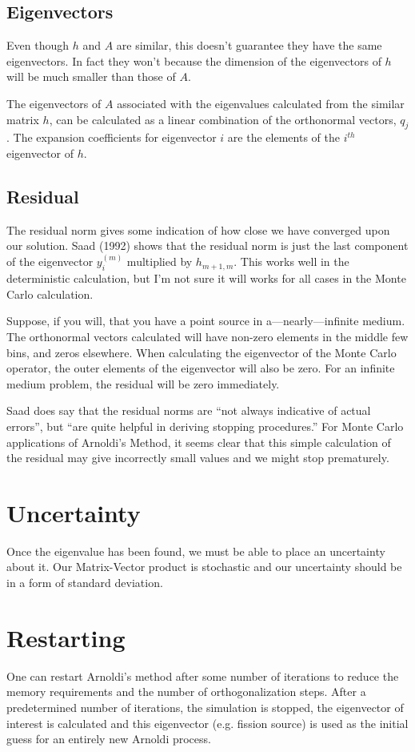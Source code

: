 \documentclass[12pt]{article}
\begin{document}
\subsection{Eigenvectors}
Even though $h$ and $A$ are similar, this doesn't guarantee they have the same eigenvectors.  In fact they won't because the dimension of the eigenvectors of $h$ will be much smaller than those of $A$.  

The eigenvectors of $A$ associated with the eigenvalues calculated from the similar matrix $h$, can be calculated as a linear combination of the orthonormal vectors, $q_j$.  The expansion coefficients for eigenvector $i$ are the elements of the $i^{th}$ eigenvector of $h$. 

\subsection{Residual}
The residual norm gives some indication of how close we have converged upon our solution.  Saad (1992) shows that the residual norm is just the last component of the eigenvector $y_i^{(m)}$ multiplied by $h_{m+1,m}$.  This works well in the deterministic calculation, but I'm not sure it will works for all cases in the Monte Carlo calculation.

Suppose, if you will, that you have a point source in a---nearly---infinite medium.  The orthonormal vectors calculated will have non-zero elements in the middle few bins, and zeros elsewhere.  When calculating the eigenvector of the Monte Carlo operator, the outer elements of the eigenvector will also be zero.  For an infinite medium problem, the residual will be zero immediately.  

Saad does say that the residual norms are ``not always indicative of actual errors'', but ``are quite helpful in deriving stopping procedures.''  For Monte Carlo applications of Arnoldi's Method, it seems clear that this simple calculation of the residual may give incorrectly small values and we might stop prematurely.

\section{Uncertainty}
Once the eigenvalue has been found, we must be able to place an uncertainty about it.  Our Matrix-Vector product is stochastic and our uncertainty should be in a form of standard deviation.

\section{Restarting}
One can restart Arnoldi's method after some number of iterations to reduce the memory requirements and the number of orthogonalization steps.  After a predetermined number of iterations, the simulation is stopped, the eigenvector of interest is calculated and this eigenvector (e.g. fission source) is used as the initial guess for an entirely new Arnoldi process.
\end{document}
